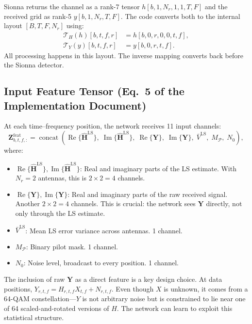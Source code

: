 \documentclass[11pt,a4paper]{article}
\newcommand{\bH}{\mathbf{H}}
\newcommand{\bY}{\mathbf{Y}}
\newcommand{\bZ}{\mathbf{Z}}
\newcommand{\Real}{\operatorname{Re}}
\newcommand{\Imag}{\operatorname{Im}}
\DeclareMathOperator{\Concat}{concat}
\begin{document}
	Sionna returns the channel as a rank-7 tensor $h[b, 1, N_r, 1, 1, T, F]$ and the received grid as rank-5 $y[b, 1, N_r, T, F]$.  The code converts both to the internal layout $[B, T, F, N_r]$ using:
	\begin{align}
		\mathcal{T}_H(h)[b,t,f,r] &= h[b,0,r,0,0,t,f], \\
		\mathcal{T}_Y(y)[b,t,f,r] &= y[b,0,r,t,f].
	\end{align}
	All processing happens in this layout.  The inverse mapping converts back before the Sionna detector.
	
	\subsection{Input Feature Tensor (Eq.~5 of the Implementation Document)}
	
	At each time--frequency position, the network receives 11 input channels:
	\begin{equation}
		\bZ^{\mathrm{feat}}_{b,t,f,:} = \Concat\!\left(
		\Real\{\widehat{\bH}^{\mathrm{LS}}\},\;
		\Imag\{\widehat{\bH}^{\mathrm{LS}}\},\;
		\Real\{\bY\},\;
		\Imag\{\bY\},\;
		\bar{V}^{\mathrm{LS}},\;
		M_\mathcal{P},\;
		N_0
		\right),
		\label{eq:features}
	\end{equation}
	where:
	\begin{itemize}[nosep]
		\item $\Real\{\widehat{\bH}^{\mathrm{LS}}\}, \Imag\{\widehat{\bH}^{\mathrm{LS}}\}$: Real and imaginary parts of the LS estimate.  With $N_r = 2$ antennas, this is $2 \times 2 = 4$ channels.
		\item $\Real\{\bY\}, \Imag\{\bY\}$: Real and imaginary parts of the raw received signal.  Another $2 \times 2 = 4$ channels.  This is crucial: the network sees $\bY$ directly, not only through the LS estimate.
		\item $\bar{V}^{\mathrm{LS}}$: Mean LS error variance across antennas.  1 channel.
		\item $M_\mathcal{P}$: Binary pilot mask.  1 channel.
		\item $N_0$: Noise level, broadcast to every position.  1 channel.
	\end{itemize}
	
	\begin{warning}
		The inclusion of raw $\bY$ as a direct feature is a key design choice.  At data positions, $Y_{r,t,f} = H_{r,t,f} X_{t,f} + N_{r,t,f}$.  Even though $X$ is unknown, it comes from a 64-QAM constellation---$Y$ is not arbitrary noise but is constrained to lie near one of 64 scaled-and-rotated versions of $H$.  The network can learn to exploit this statistical structure.
	\end{warning}
	
\end{document}
